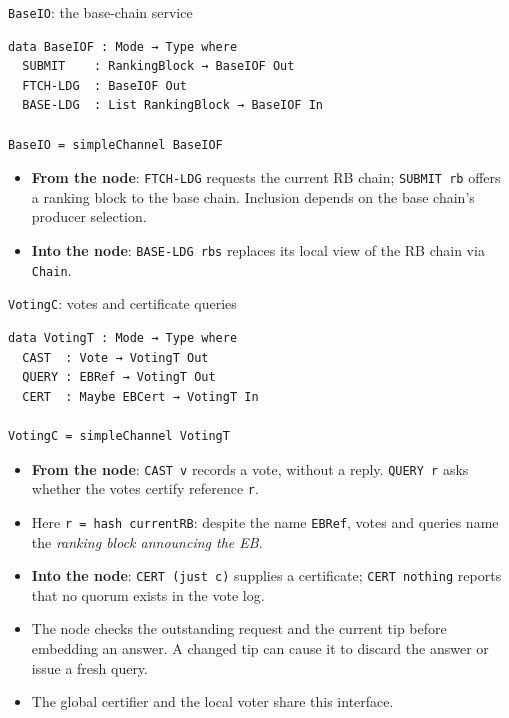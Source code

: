 \documentclass[aspectratio=169,10pt]{beamer}
\newcommand{\agda}[1]{\texttt{#1}}
\begin{document}
\begin{frame}[fragile]{\agda{BaseIO}: the base-chain service}
\begin{verbatim}
data BaseIOF : Mode → Type where
  SUBMIT    : RankingBlock → BaseIOF Out
  FTCH-LDG  : BaseIOF Out
  BASE-LDG  : List RankingBlock → BaseIOF In

BaseIO = simpleChannel BaseIOF
\end{verbatim}
  \begin{itemize}\small
    \item \textbf{From the node}: \agda{FTCH-LDG} requests the current RB
          chain; \agda{SUBMIT rb} offers a ranking block to the base chain.
          Inclusion depends on the base chain's producer selection.
    \item \textbf{Into the node}: \agda{BASE-LDG rbs} replaces its local
          view of the RB chain via \agda{Chain}.
  \end{itemize}
\end{frame}

\begin{frame}[fragile]{\agda{VotingC}: votes and certificate queries}
\begin{verbatim}
data VotingT : Mode → Type where
  CAST  : Vote → VotingT Out
  QUERY : EBRef → VotingT Out
  CERT  : Maybe EBCert → VotingT In

VotingC = simpleChannel VotingT
\end{verbatim}
  \begin{itemize}
    \item \textbf{From the node}: \agda{CAST v} records a vote, without a
          reply.  \agda{QUERY r} asks whether the votes certify reference
          \agda{r}.
    \item Here \agda{r = hash currentRB}: despite the name \agda{EBRef},
          votes and queries name the \emph{ranking block announcing the EB}.
    \item \textbf{Into the node}: \agda{CERT (just c)} supplies a certificate;
          \agda{CERT nothing} reports that no quorum exists in the vote log.
    \item The node checks the outstanding request and the current tip before
          embedding an answer.  A changed tip can cause it to discard the
          answer or issue a fresh query.
    \item The global certifier and the local voter share this interface.
  \end{itemize}
\end{frame}
\end{document}
